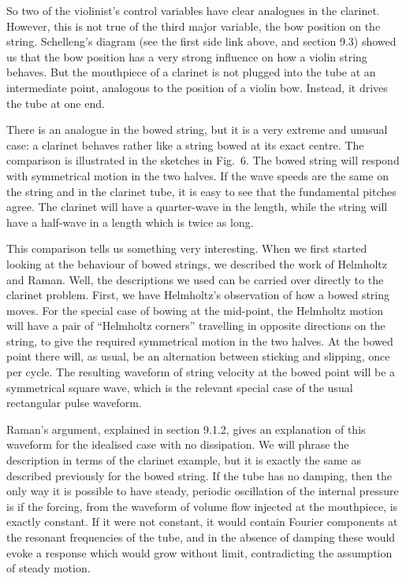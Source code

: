   So two of the violinist’s control variables have clear analogues in the 
  clarinet. However, this is not true of the third major variable, the bow 
  position on the string. Schelleng’s diagram (see the first side link above, 
  and section 9.3) showed us that the bow position has a very strong influence 
  on how a violin string behaves. But the mouthpiece of a clarinet is not 
  plugged into the tube at an intermediate point, analogous to the position of 
  a violin bow. Instead, it drives the tube at one end. 

  There is an analogue in the bowed string, but it is a very extreme and 
  unusual case: a clarinet behaves rather like a string bowed at its exact 
  centre. The comparison is illustrated in the sketches in Fig.\ 6. The bowed 
  string will respond with symmetrical motion in the two halves. If the wave 
  speeds are the same on the string and in the clarinet tube, it is easy to see 
  that the fundamental pitches agree. The clarinet will have a quarter-wave in 
  the length, while the string will have a half-wave in a length which is twice 
  as long. 

  This comparison tells us something very interesting. When we first started 
  looking at the behaviour of bowed strings, we described the work of Helmholtz 
  and Raman. Well, the descriptions we used can be carried over directly to the 
  clarinet problem. First, we have Helmholtz’s observation of how a bowed 
  string moves. For the special case of bowing at the mid-point, the Helmholtz 
  motion will have a pair of “Helmholtz corners” travelling in opposite 
  directions on the string, to give the required symmetrical motion in the two 
  halves. At the bowed point there will, as usual, be an alternation between 
  sticking and slipping, once per cycle. The resulting waveform of string 
  velocity at the bowed point will be a symmetrical square wave, which is the 
  relevant special case of the usual rectangular pulse waveform. 

  Raman’s argument, explained in section 9.1.2, gives an explanation of this 
  waveform for the idealised case with no dissipation. We will phrase the 
  description in terms of the clarinet example, but it is exactly the same as 
  described previously for the bowed string. If the tube has no damping, then 
  the only way it is possible to have steady, periodic oscillation of the 
  internal pressure is if the forcing, from the waveform of volume flow 
  injected at the mouthpiece, is exactly constant. If it were not constant, it 
  would contain Fourier components at the resonant frequencies of the tube, and 
  in the absence of damping these would evoke a response which would grow 
  without limit, contradicting the assumption of steady motion. 

